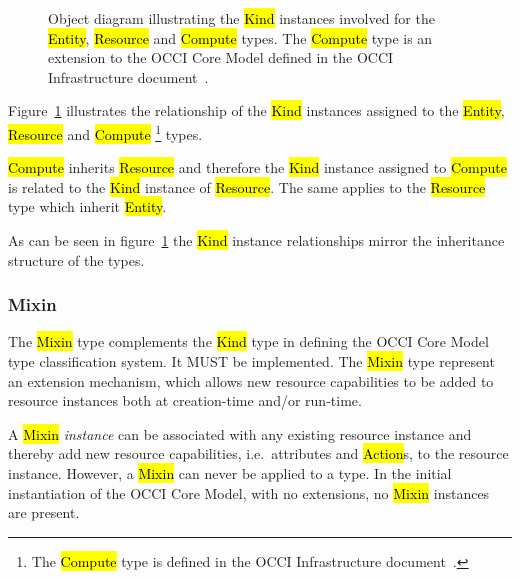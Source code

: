 \documentclass[10pt,a4paper]{article}
\begin{document}
\begin{figure}[!h]
  {\centering {} \par}
  \caption{Object diagram illustrating the \hl{Kind} instances
    involved for the \hl{Entity}, \hl{Resource} and \hl{Compute}
    types. The \hl{Compute} type is an extension to the OCCI Core
    Model defined in the OCCI Infrastructure
    document~\cite{occi:infrastructure}.}
  \label{fig:kind_relationships}
\end{figure}

Figure~\ref{fig:kind_relationships} illustrates the relationship of
the \hl{Kind} instances assigned to the \hl{Entity}, \hl{Resource} and
\hl{Compute}
\footnote{The \hl{Compute} type is defined in the OCCI Infrastructure
 document~\cite{occi:infrastructure}.}
types.

\hl{Compute} inherits \hl{Resource} and therefore the \hl{Kind}
instance assigned to \hl{Compute} is related to the \hl{Kind} instance
of \hl{Resource}.  The same applies to the \hl{Resource} type which
inherit \hl{Entity}.

As can be seen in figure~\ref{fig:kind_relationships} the \hl{Kind}
instance relationships mirror the inheritance structure of the types.

\subsubsection{Mixin}
The \hl{Mixin} type complements the \hl{Kind} type in defining the
OCCI Core Model type classification system. It MUST be
implemented. The \hl{Mixin} type represent an extension mechanism,
which allows new resource capabilities to be added to resource
instances both at creation-time and/or run-time.

A \hl{Mixin} {\em instance} can be associated with any existing
resource instance and thereby add new resource capabilities,
i.e.~attributes and \hl{Action}s, to the resource instance. However, a
\hl{Mixin} can never be applied to a type.  In the initial
instantiation of the OCCI Core Model, with no extensions, no
\hl{Mixin} instances are present.
\end{document}

